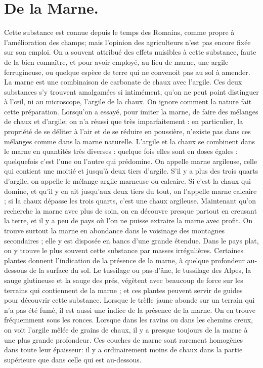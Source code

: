 \section{De la Marne.}
Cette substance est connue depuis le temps des Romains, comme propre à l'amélioration des champs; mais l'opinion des agriculteurs n'est pas encore fixée sur son emploi. On a souvent attribué des effets nuisibles à cette substance, faute de la bien connaître, et pour avoir employé, au lieu de marne, une argile ferrugineuse, ou quelque espèce de terre qui ne convenoit pas au sol à amender.
La marne est une combinaison de carbonate de chaux avec l'argile. Ces deux substances s'y trouvent amalgamées si intimément, qu'on ne peut point distinguer à l'œil, ni au microscope, l'argile de la chaux. On ignore comment la nature fait cette préparation. Lorsqu'on a essayé, pour imiter la marne, de faire des mélanges de chaux et d'argile; on n'a réussi que très imparfaitement : en particulier, la propriété de se déliter à l'air et de se réduire en poussière, n'existe pas dans ces mélanges comme dans la marne naturelle.
L'argile et la chaux se combinent dans le marne en quantités très diverses : quelque\setcounter{page}{46} fois elles sont en doses égales : quelquefois c'est l'une ou l'autre qui prédomine. On appelle marne argileuse, celle qui contient une moitié et jusqu'à deux tiers d'argile. S'il y a plus des trois quarts d'argile, on appelle le mélange argile marneuse ou calcaire. Si c'est la chaux qui domine, et qu'il y en ait jusqu'aux deux tiers du tout, on l'appelle marne calcaire ; si la chaux dépasse les trois quarts, c'est une chaux argileuse.
Maintenant qu'on recherche la marne avec plus de soin, on en découvre presque partout en creusant la terre, et il y a peu de pays où l'on ne puisse extraire la marne avec profit.
On trouve surtout la marne en abondance dans le voisinage des montagnes secondaires ; elle y est disposée en bancs d'une grande étendue. Dans le pays plat, on y trouve le plus souvent cette substance par masses irrégulières. Certaines plantes donnent l'indication de la présence de la marne, à quelque profondeur au-dessous de la surface du sol. Le tussilage ou pas-d'âne, le tussilage des Alpes, la sauge glutineuse et la sauge des prés, végètent avec beaucoup de force sur les terrains qui contiennent de la marne ; et ces plantes peuvent servir de guides pour découvrir cette substance.\setcounter{page}{47} Lorsque le trèfle jaune abonde sur un terrain qui n'a pas été fumé, il est aussi une indice de la présence de la marne. On en trouve fréquemment sous les ronces. Lorsque dans les ravins ou dans les chemins creux, on voit l'argile mêlée de grains de chaux, il y a presque toujours de la marne à une plus grande profondeur. Ces couches de marne sont rarement homogènes dans toute leur épaisseur: il y a ordinairement moins de chaux dans la partie supérieure que dans celle qui est au-dessous.
